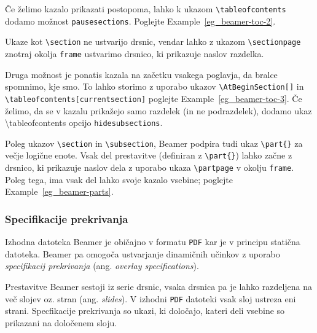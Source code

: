 \begin{example}\label{eg_beamer-toc-1}\end{example}Če želimo kazalo prikazati postopoma, lahko k ukazom \texttt{{\textbackslash}tableofcontents} dodamo možnost \texttt{pausesections}. Poglejte Example~\ref{eg_beamer-toc-2}.

\begin{example}\label{eg_beamer-toc-2}\end{example}Ukaze kot \texttt{{\textbackslash}section} ne ustvarijo drsnic, vendar lahko z ukazom \texttt{{\textbackslash}sectionpage} znotraj okolja \texttt{frame} ustvarimo drsnico, ki prikazuje naslov razdelka.


Druga možnost je ponatis kazala na začetku vsakega poglavja, da bralce spomnimo, kje smo.
To lahko storimo z uporabo ukazov \texttt{{\textbackslash}AtBeginSection[]} in \texttt{{\textbackslash}tableofcontents[currentsection]} poglejte Example~\ref{eg_beamer-toc-3}. Če želimo, da se v kazalu prikažejo samo razdelek (in ne podrazdelek), dodamo ukaz {\textbackslash}tableofcontents opcijo \texttt{hidesubsections}.

\begin{example}\label{eg_beamer-toc-3}\end{example}Poleg ukazov \texttt{{\textbackslash}section} in \texttt{{\textbackslash}subsection}, Beamer podpira tudi ukaz \texttt{{\textbackslash}part\{\}} za večje logične enote.
Vsak del prestavitve (definiran z \texttt{{\textbackslash}part\{\}}) lahko začne z drsnico, ki prikazuje naslov dela z uporabo ukaza \texttt{{\textbackslash}partpage} v okolju \texttt{frame}. Poleg tega, ima vsak del lahko svoje kazalo vsebine; poglejte Example~\ref{eg_beamer-parts}.

\begin{example}\label{eg_beamer-parts}\end{example}\subsubsection{Specifikacije prekrivanja}\label{beamer_prekrivanje}

Izhodna datoteka Beamer je običajno v formatu \texttt{PDF} kar je v principu statična datoteka. Beamer pa omogoča ustvarjanje dinamičnih učinkov z uporabo \textit{specifikacij prekrivanja} (ang. \textit{overlay specifications}).

Prestavitve Beamer sestoji iz serie drsnic, vsaka drsnica pa je lahko razdeljena na več slojev oz. stran (ang. \textit{slides}). V izhodni \texttt{PDF} datoteki vsak sloj ustreza eni strani. Specfikacije prekrivanja so ukazi, ki določajo, kateri deli vsebine so prikazani na določenem sloju.

